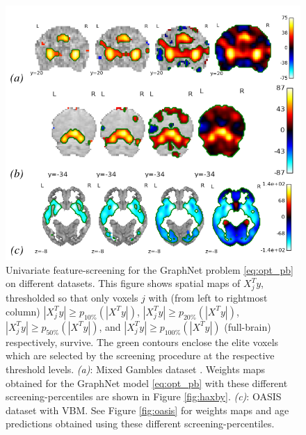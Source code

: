  \begin{figure}[!htb]
   \includegraphics[width=1\linewidth]{figures/screening.png}
\caption{Univariate feature-screening for the
  GraphNet
  problem \eqref{eq:opt_pb} on
  different datasets.
  This figure shows spatial maps of
  $X^T_jy$, thresholded so that only voxels $j$ with (from left to
  rightmost column)  $|X^T_jy| \ge p_{10\%}(|X^Ty|)$, $|X^T_jy| \ge
  p_{20\%}(|X^Ty|)$, $|X^T_jy| \ge p_{50\%}(|X^Ty|)$, and $|X^T_jy|
  \ge p_{100\%}(|X^Ty|)$ (full-brain) respectively, survive. The
  green contours enclose the elite voxels which are selected by the
  screening procedure at the respective threshold
  levels. \textit{(a)}: Mixed Gambles dataset
   \citep{jimura2012}.%
  Weights maps obtained for the GraphNet
  model \eqref{eq:opt_pb} with these different
  screening-percentiles are shown in Figure
  \ref{fig:haxby}. \textit{(c)}: OASIS dataset  \citep{marcus2007open}
  with VBM. See Figure \ref{fig:oasis} for weights maps and
  age predictions obtained using these different
  screening-percentiles. %
}

\label{fig:screening}
\end{figure}

